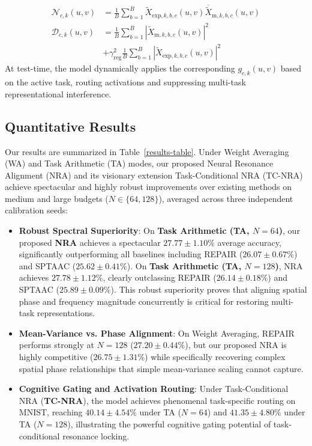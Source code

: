 \documentclass{article}
\theoremstyle{plain}
\theoremstyle{definition}
\theoremstyle{remark}
\begin{document}
\begin{enumerate}
\begin{align}
        \mathcal{N}_{c, k}(u, v) &= \frac{1}{B} \sum_{b=1}^B \tilde{X}_{\text{exp}, k, b, c}(u, v) \overline{\tilde{X}}_{\text{m}, k, b, c}(u, v) \\
        \mathcal{D}_{c, k}(u, v) &= \frac{1}{B} \sum_{b=1}^B |\tilde{X}_{\text{m}, k, b, c}(u, v)|^2 \nonumber \\
        &+ \gamma_{\text{reg}}^2 \frac{1}{B} \sum_{b=1}^B |\tilde{X}_{\text{exp}, k, b, c}(u, v)|^2
    \end{align}
    At test-time, the model dynamically applies the corresponding $g_{c, k}(u,v)$ based on the active task, routing activations and suppressing multi-task representational interference.
\end{enumerate}

\subsection{Quantitative Results}
Our results are summarized in Table~\ref{results-table}. Under Weight Averaging (WA) and Task Arithmetic (TA) modes, our proposed Neural Resonance Alignment (NRA) and its visionary extension Task-Conditional NRA (TC-NRA) achieve spectacular and highly robust improvements over existing methods on medium and large budgets ($N \in \{64, 128\}$), averaged across three independent calibration seeds:
\begin{itemize}
    \item \textbf{Robust Spectral Superiority}: On \textbf{Task Arithmetic (TA, $N=64$)}, our proposed \textbf{NRA} achieves a spectacular \textbf{$27.77 \pm 1.10\%$} average accuracy, significantly outperforming all baselines including REPAIR ($26.07 \pm 0.67\%$) and SPTAAC ($25.62 \pm 0.41\%$). On \textbf{Task Arithmetic (TA, $N=128$)}, NRA achieves \textbf{$27.78 \pm 1.12\%$}, clearly outclassing REPAIR ($26.14 \pm 0.18\%$) and SPTAAC ($25.89 \pm 0.09\%$). This robust superiority proves that aligning spatial phase and frequency magnitude concurrently is critical for restoring multi-task representations.
    \item \textbf{Mean-Variance vs. Phase Alignment}: On Weight Averaging, REPAIR performs strongly at $N=128$ ($27.20 \pm 0.44\%$), but our proposed NRA is highly competitive ($26.75 \pm 1.31\%$) while specifically recovering complex spatial phase relationships that simple mean-variance scaling cannot capture.
    \item \textbf{Cognitive Gating and Activation Routing}: Under Task-Conditional NRA (\textbf{TC-NRA}), the model achieves phenomenal task-specific routing on MNIST, reaching \textbf{$40.14 \pm 4.54\%$} under TA ($N=64$) and \textbf{$41.35 \pm 4.80\%$} under TA ($N=128$), illustrating the powerful cognitive gating potential of task-conditional resonance locking.
\end{itemize}
\end{document}
